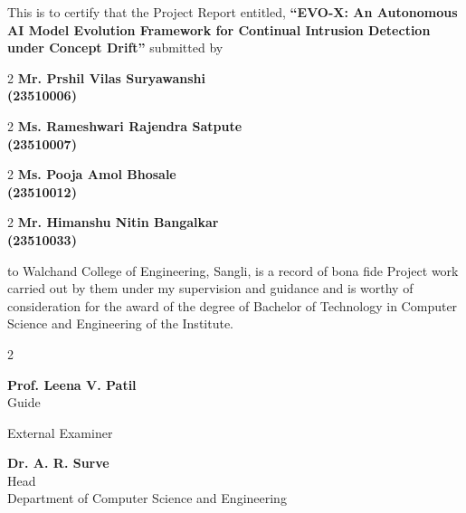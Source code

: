 \documentclass{article}
\begin{document}
	\par
	\setlength{\parindent}{4em}
	\space
This is to certify that the Project Report entitled,
\textbf {``EVO-X: An Autonomous AI Model Evolution Framework for Continual Intrusion Detection under Concept Drift''} submitted by\\
			\begin{multicols}{2}
			\textbf{Mr. Prshil Vilas Suryawanshi\\ (23510006)}
			\end{multicols}
			\begin{multicols}{2}
		    \textbf{Ms. Rameshwari Rajendra Satpute\\ (23510007)}
			\end{multicols}
			\begin{multicols}{2}
		    \textbf{Ms. Pooja Amol Bhosale\\ (23510012)}
			\end{multicols}
			\begin{multicols}{2}
		    \textbf{Mr. Himanshu Nitin Bangalkar\\ (23510033)}
			 \end{multicols}
 to Walchand College of Engineering, Sangli, is a record of bona fide Project work carried out by them under my supervision and guidance and is worthy of consideration for the award of the degree of Bachelor of Technology in Computer Science and Engineering of the Institute.


				\vspace{1.2cm}
\begin{multicols}{2}
	\begin{center}
	\textbf{Prof. Leena V. Patil}
	\\ Guide
	\end{center}
	\columnbreak
	\begin{center}
	External Examiner
	\end{center}
\end{multicols}

\vspace{0.8cm}
\begin{center}
	\textbf{Dr. A. R. Surve}
	\\ Head
	\\ Department of Computer Science and Engineering
\end{center}

	\pagebreak
\end{document}
